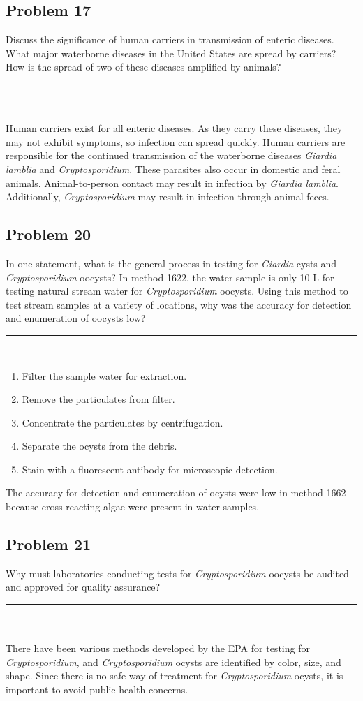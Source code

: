 \subsection*{Problem 17}
Discuss the significance of human carriers in transmission of enteric diseases. What major waterborne diseases in the United States are spread by carriers? How is the spread of two of these diseases amplified by animals?\\
\rule{5cm}{1pt}
\\\\Human carriers exist for all enteric diseases. As they carry these diseases, they may not exhibit symptoms, so infection can spread quickly. Human carriers are responsible for the continued transmission of the waterborne diseases \emph{Giardia lamblia} and \emph{Cryptosporidium}. These parasites also occur in domestic and feral animals. Animal-to-person contact may result in infection by \emph{Giardia lamblia}. Additionally, \emph{Cryptosporidium} may result in infection through animal feces.
\newpage
\subsection*{Problem 20}
In one statement, what is the general process in testing for \emph{Giardia} cysts and \emph{Cryptosporidium} oocysts? In method 1622, the water sample is only 10 L for testing natural stream water for \emph{Cryptosporidium} oocysts. Using this method to test stream samples at a variety of locations, why was the accuracy for detection and enumeration of oocysts low?\\
\rule{5cm}{1pt}
\\
\begin{enumerate}
    \item Filter the sample water for extraction.
    \item Remove the particulates from filter.
    \item Concentrate the particulates by centrifugation.
    \item Separate the ocysts from the debris.
    \item Stain with a fluorescent antibody for microscopic detection.
\end{enumerate}
The accuracy for detection and enumeration of ocysts were low in method 1662 because cross-reacting algae were present in water samples.
\subsection*{Problem 21}
Why must laboratories conducting tests for \emph{Cryptosporidium} oocysts be audited and approved for quality assurance?\\
\rule{5cm}{1pt}
\\\\There have been various methods developed by the EPA for testing for \emph{Cryptosporidium}, and \emph{Cryptosporidium} ocysts are identified by color, size, and shape. Since there is no safe way of treatment for \emph{Cryptosporidium} ocysts, it is important to avoid public health concerns.
